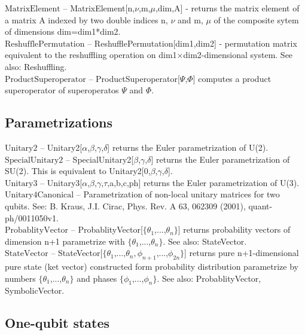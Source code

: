 \noindent\textbf{$ \text{MatrixElement} $ }-- MatrixElement[n,$\nu $,m,$\mu $,dim,A] - returns the matrix element of a matrix A indexed by two double indices n, $\nu $ and m, $\mu $ of the composite sytem of dimensions dim=dim1*dim2.$  $\\
\noindent\textbf{$ \text{ReshufflePermutation} $ }-- ReshufflePermutation[dim1,dim2] - permutation matrix equivalent to the reshuffling operation on dim1$\times $dim2-dimensional system. See also: Reshuffling.$  $\\
\noindent\textbf{$ \text{ProductSuperoperator} $ }-- ProductSuperoperator[$\Psi $,$\Phi $] computes a product superoperator of superoperatos $\Psi $ and $\Phi $.$  $\\
\subsection{Parametrizations}

\noindent\textbf{$ \text{Unitary2} $ }-- Unitary2[$\alpha $,$\beta $,$\gamma $,$\delta $] returns the Euler parametrization of U(2).$  $\\
\noindent\textbf{$ \text{SpecialUnitary2} $ }-- SpecialUnitary2[$\beta $,$\gamma $,$\delta $] returns the Euler parametrization of SU(2). This is equivalent to Unitary2[0,$\beta $,$\gamma $,$\delta $].$  $\\
\noindent\textbf{$ \text{Unitary3} $ }-- Unitary3[$\alpha $,$\beta $,$\gamma $,$\tau $,a,b,c,ph] returns the Euler parametrization of U(3).$  $\\
\noindent\textbf{$ \text{Unitary4Canonical} $ }-- Parametrization of non-local unitary matrices for two qubits. See: B. Kraus, J.I. Cirac, Phys. Rev. A 63, 062309 (2001), quant-ph/0011050v1.$  $\\
\noindent\textbf{$ \text{ProbablityVector} $ }-- ProbablityVector[$\{$$ \theta _1 $,...,$ \theta _n $$\}$] returns probability vectors of dimension n+1 parametrize with $\{$$ \theta _1 $,...,$ \theta _n $$\}$. See also: StateVector.$  $\\
\noindent\textbf{$ \text{StateVector} $ }-- StateVector[$\{$$ \theta _1 $,...,$ \theta _n,\phi _{n+1} $,...,$ \phi _{2 n} $$\}$] returns pure n+1-dimensional pure state (ket vector) constructed form probability distribution parametrize by numbers $\{$$ \theta _1 $,...,$ \theta _n $$\}$ and phases $\{$$ \phi _1 $,...,$ \phi _n $$\}$. See also: ProbablityVector, SymbolicVector.$  $\\
\subsection{One-qubit states}

